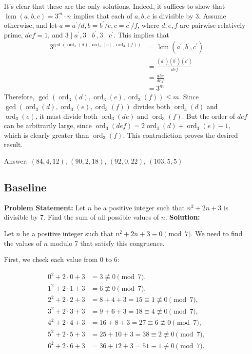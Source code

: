 \documentclass[11pt]{article}
\begin{document}
It's clear that these are the only solutions. Indeed, it suffices to show that $\operatorname{lcm}(a,b,c)=3^{m} \cdot n$ implies that each of $a,b,c$ is divisible by $3$. Assume otherwise, and let $a=a^{\prime} / d, b=b^{\prime} / e, c=c^{\prime} / f$, where $d, e, f$ are pairwise relatively prime, $d e f=1$, and $3 \mid a^{\prime}, 3 \mid b^{\prime}, 3 \mid c^{\prime}$. This implies that $$\begin{aligned} 3^{\text {gcd }(\operatorname{ord}_{3}(d),\operatorname{ord}_{3}(e),\operatorname{ord}_{3}(f))} & =\operatorname{lcm}(a^{\prime}, b^{\prime}, c^{\prime}) \\ & =\frac{(a^{\prime})(b^{\prime})(c^{\prime})}{d e f} \\ & =\frac{a b c}{d e f} \\ & =3^{m} \end{aligned}$$ Therefore, $\operatorname{gcd}(\operatorname{ord}_{3}(d), \operatorname{ord}_{3}(e), \operatorname{ord}_{3}(f)) \leq m$. Since $\operatorname{gcd}(\operatorname{ord}_{3}(d), \operatorname{ord}_{3}(e), \operatorname{ord}_{3}(f))$ divides both $\operatorname{ord}_{3}(d)$ and $\operatorname{ord}_{3}(e)$, it must divide both $\operatorname{ord}_{3}(d e)$ and $\operatorname{ord}_{3}(f)$. But the order of $d e f$ can be arbitrarily large, since $\operatorname{ord}_{3}(d e f)=2 \operatorname{ord}_{3}(d)+\operatorname{ord}_{3}(e)-1$, which is clearly greater than $\operatorname{ord}_{3}(f)$. This contradiction proves the desired result.

Answer: $(84,4,12)$, $(90,2,18)$, $(92,0,22)$, $(103,5,5)$

\subsection*{Baseline}

\textbf{Problem Statement:}
Let \( n \) be a positive integer such that \( n^2 + 2n + 3 \) is divisible by 7. Find the sum of all possible values of \( n \).
\medskip
\textbf{Solution:}

Let \( n \) be a positive integer such that \( n^2 + 2n + 3 \equiv 0 \pmod{7} \). We need to find the values of \( n \) modulo 7 that satisfy this congruence.

First, we check each value from 0 to 6:

\[
\begin{aligned}
0^2 + 2 \cdot 0 + 3 & = 3 \not\equiv 0 \pmod{7}, \\
1^2 + 2 \cdot 1 + 3 & = 6 \not\equiv 0 \pmod{7}, \\
2^2 + 2 \cdot 2 + 3 & = 8 + 4 + 3 = 15 \equiv 1 \not\equiv 0 \pmod{7}, \\
3^2 + 2 \cdot 3 + 3 & = 9 + 6 + 3 = 18 \equiv 4 \not\equiv 0 \pmod{7}, \\
4^2 + 2 \cdot 4 + 3 & = 16 + 8 + 3 = 27 \equiv 6 \not\equiv 0 \pmod{7}, \\
5^2 + 2 \cdot 5 + 3 & = 25 + 10 + 3 = 38 \equiv 2 \not\equiv 0 \pmod{7}, \\
6^2 + 2 \cdot 6 + 3 & = 36 + 12 + 3 = 51 \equiv 1 \not\equiv 0 \pmod{7}.
\end{aligned}
\]
\end{document}
